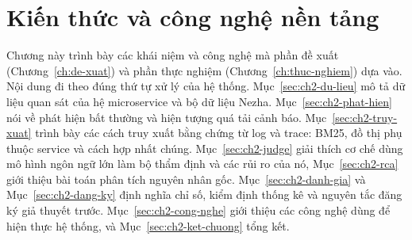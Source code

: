 %        
%        
%        
%        
%

\chapter{Kiến thức và công nghệ nền tảng}
\label{ch:nen-tang}

Chương này trình bày các khái niệm và công nghệ mà phần đề xuất (Chương~\ref{ch:de-xuat}) và phần thực nghiệm (Chương~\ref{ch:thuc-nghiem}) dựa vào. Nội dung đi theo đúng thứ tự xử lý của hệ thống. Mục~\ref{sec:ch2-du-lieu} mô tả dữ liệu quan sát của hệ microservice và bộ dữ liệu Nezha. Mục~\ref{sec:ch2-phat-hien} nói về phát hiện bất thường và hiện tượng quá tải cảnh báo. Mục~\ref{sec:ch2-truy-xuat} trình bày các cách truy xuất bằng chứng từ log và trace: BM25, đồ thị phụ thuộc service và cách hợp nhất chúng. Mục~\ref{sec:ch2-judge} giải thích cơ chế dùng mô hình ngôn ngữ lớn làm bộ thẩm định và các rủi ro của nó, Mục~\ref{sec:ch2-rca} giới thiệu bài toán phân tích nguyên nhân gốc. Mục~\ref{sec:ch2-danh-gia} và Mục~\ref{sec:ch2-dang-ky} định nghĩa chỉ số, kiểm định thống kê và nguyên tắc đăng ký giả thuyết trước. Mục~\ref{sec:ch2-cong-nghe} giới thiệu các công nghệ dùng để hiện thực hệ thống, và Mục~\ref{sec:ch2-ket-chuong} tổng kết.

